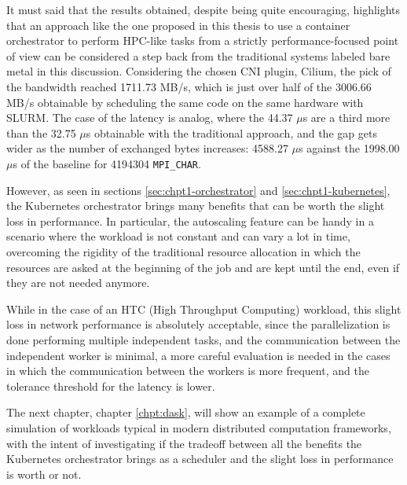 It must said that the results obtained, despite being quite encouraging,
highlights that an approach like the one proposed in this thesis to use a
container orchestrator to perform HPC-like tasks from a strictly
performance-focused point of view can be considered a step back from the
traditional systems labeled bare metal in this discussion.
Considering the chosen CNI plugin, Cilium, the pick of the bandwidth reached
1711.73 MB/s, which is just over half of the 3006.66 MB/s obtainable by
scheduling the same code on the same hardware with SLURM.
The case of the latency is analog, where the 44.37 $\mu$s are a third more than
the 32.75 $\mu$s obtainable with the traditional approach, and the gap gets
wider as the number of exchanged bytes increases: 4588.27 $\mu$s against the
1998.00 $\mu$s of the baseline for 4194304 \texttt{MPI\_CHAR}.

However, as seen in sections \ref{sec:chpt1-orchestrator} and
\ref{sec:chpt1-kubernetes}, the Kubernetes orchestrator brings many benefits
that can be worth the slight loss in performance.
In particular, the autoscaling feature can be handy in a scenario where the
workload is not constant and can vary a lot in time, overcoming the rigidity of
the traditional resource allocation in which the resources are asked at the
beginning of the job and are kept until the end, even if they are not needed
anymore.

While in the case of an HTC (High Throughput Computing) workload, this slight
loss in network performance is absolutely acceptable, since the parallelization
is done performing multiple independent tasks, and the communication between the
independent worker is minimal, a more careful evaluation is needed in the cases
in which the communication between the workers is more frequent, and the
tolerance threshold for the latency is lower.

The next chapter, chapter \ref{chpt:dask}, will show an example of a complete
simulation of workloads typical in modern distributed computation frameworks,
with the intent of investigating if the tradeoff between all the benefits the
Kubernetes orchestrator brings as a scheduler and the slight loss in performance
is worth or not.
